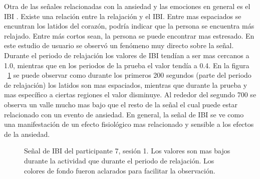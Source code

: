 Otra de las se\~nales relacionadas con la ansiedad y las emociones en general es el IBI \citep{Cinaz13}. Existe una relaci\'on entre la relajaci\'on y el IBI. Entre mas espaciados se encuntran los latidos del coraz\'on, podr\'ia indicar que la persona se encuentra m\'as relajado. Entre m\'as cortos sean, la persona se puede encontrar mas estresado. En este estudio de usuario se observ\'o un fen\'omeno muy directo sobre la se\~nal. Durante el periodo de relajaci\'on los valores de IBI tend\'ian a ser mas cercanos a 1.0, mientras que en los periodos de la prueba el valor tend\'ia a 0.4. En la figura ~\ref{fig:ibianxiety} se puede observar como durante los primeros 200 segundos (parte del periodo de relajaci\'on) los latidos son mas espaciados, mientras que durante la prueba y mas espec\'ifico a ciertas regiones el valor disminuye. Al rededor del segundo 700 se observa un valle mucho mas bajo que el resto de la se\~nal el cual puede estar relacionado con un evento de ansiedad. En general, la se\~nal de IBI se ve como una manifestaci\'on de un efecto fisiol\'ogico mas relacionado y sensible a los efectos de la ansiedad.

\begin{figure}[h!]
        \centering
        \caption{Se\~nal de IBI del participante 7, sesi\'on 1. Los valores son mas bajos durante la actividad que durante el periodo de relajaci\'on. Los colores de fondo fueron aclarados para facilitar la observaci\'on.}\label{fig:ibianxiety}
\end{figure}


